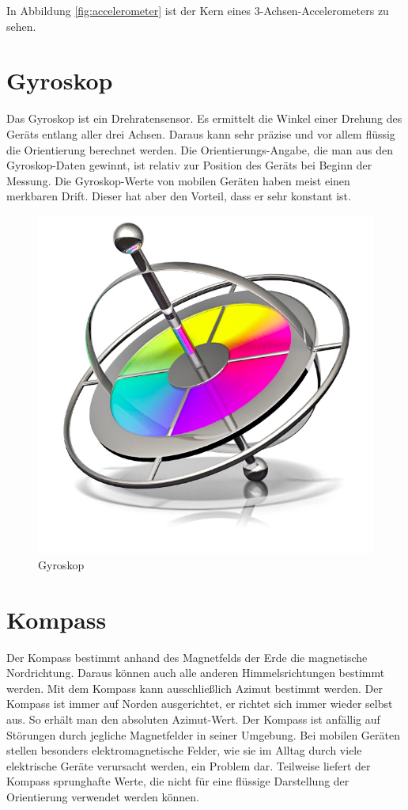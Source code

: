 In Abbildung \ref{fig:accelerometer} ist der Kern eines 3-Achsen-Accelerometers zu sehen.

\section{Gyroskop}

Das Gyroskop ist ein Drehratensensor. Es ermittelt die Winkel einer Drehung des Geräts entlang aller drei Achsen. Daraus kann sehr präzise und vor allem flüssig die Orientierung berechnet werden. Die Orientierungs-Angabe, die man aus den Gyroskop-Daten gewinnt, ist relativ zur Position des Geräts bei Beginn der Messung. Die Gyroskop-Werte von mobilen Geräten haben meist einen merkbaren Drift. Dieser hat aber den Vorteil, dass er sehr konstant ist.

\begin{figure}[htb]
\centering
\includegraphics[scale=0.5]{figures/gyroscope}
\caption{Gyroskop \cite{apple:003} }
\label{fig:gyroskop}
\end{figure}
  
\section{Kompass}
Der Kompass bestimmt anhand des Magnetfelds der Erde die magnetische Nordrichtung. Daraus können auch alle anderen Himmelsrichtungen bestimmt werden. Mit dem Kompass kann ausschließlich Azimut bestimmt werden. Der Kompass ist immer auf Norden ausgerichtet, er richtet sich immer wieder selbst aus. So erhält man den absoluten Azimut-Wert. Der Kompass ist anfällig auf Störungen durch jegliche Magnetfelder in seiner Umgebung. Bei mobilen Geräten stellen besonders elektromagnetische Felder, wie sie im Alltag durch viele elektrische Geräte verursacht werden, ein Problem dar. Teilweise liefert der Kompass sprunghafte Werte, die nicht für eine flüssige Darstellung der Orientierung verwendet werden können.


